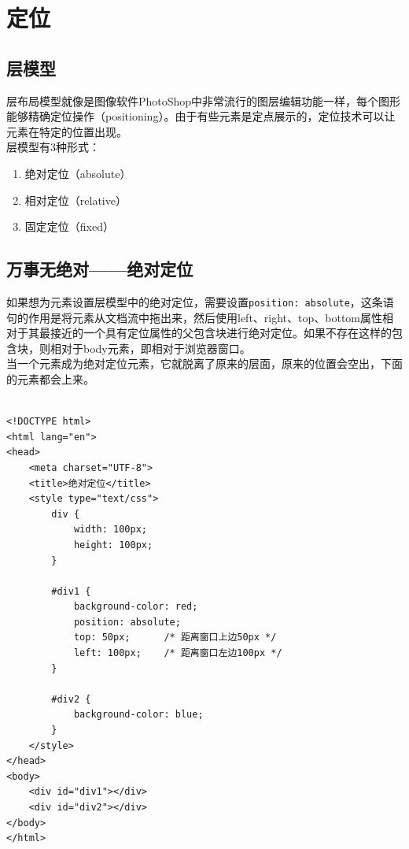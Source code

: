 \newpage

\section{定位}

\subsection{层模型}

层布局模型就像是图像软件PhotoShop中非常流行的图层编辑功能一样，每个图形能够精确定位操作（positioning）。由于有些元素是定点展示的，定位技术可以让元素在特定的位置出现。 \\

层模型有3种形式：

\begin{enumerate}
	\item 绝对定位（absolute）
	\item 相对定位（relative）
	\item 固定定位（fixed）
\end{enumerate}

\subsection{万事无绝对——绝对定位}

如果想为元素设置层模型中的绝对定位，需要设置\lstinline|position: absolute|，这条语句的作用是将元素从文档流中拖出来，然后使用left、right、top、bottom属性相对于其最接近的一个具有定位属性的父包含块进行绝对定位。如果不存在这样的包含块，则相对于body元素，即相对于浏览器窗口。 \\

当一个元素成为绝对定位元素，它就脱离了原来的层面，原来的位置会空出，下面的元素都会上来。 \\

 \\
\begin{lstlisting}[style=htmlcssjs]
<!DOCTYPE html>
<html lang="en">
<head>
    <meta charset="UTF-8">
    <title>绝对定位</title>
    <style type="text/css">
        div {
            width: 100px;
            height: 100px;
        }

        #div1 {
            background-color: red;
            position: absolute;
            top: 50px;      /* 距离窗口上边50px */
            left: 100px;    /* 距离窗口左边100px */
        }

        #div2 {
            background-color: blue;
        }
    </style>
</head>
<body>
    <div id="div1"></div>
    <div id="div2"></div>
</body>
</html>
\end{lstlisting}

